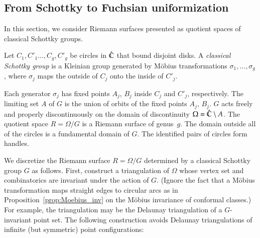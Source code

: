 \documentclass[Thesis]{subfiles}
\begin{document}
\subsection{From Schottky to Fuchsian uniformization}
\label{sec:schottky}

In this section, we consider Riemann surfaces presented as quotient
spaces of classical Schottky groups.

\begin{definition} Let $C_1,C'_1\ldots,C_g,C'_g$ be circles in
  $\hat{\mathbb C}$ that bound disjoint disks. A \emph{classical Schottky
    group} is a Kleinian group generated by M{\"o}bius transformations
  $\sigma_1,\ldots,\sigma_g$,
  where $\sigma_j$ maps the outside of $C_j$ onto the inside of $C'_j$.
\end{definition}

Each generator $\sigma_{j}$ has fixed points $A_{j}$, $B_{j}$ inside
$C_{j}$ and $C'_{j}$, respectively. The limiting set $A$ of $G$ is the
union of orbits of the fixed points $A_{j}$, $B_{j}$. $G$ acts freely
and properly discontinuously on the domain of discontinuity
$\Omega=\hat{\mathbb C}\setminus A$. The quotient space $R=\Omega/G$ is a
Riemann surface of genus~$g$. The domain outside all of the circles is
a fundamental domain of $G$. The identified pairs of circles form
handles.

We discretize the Riemann surface $R=\Omega/G$ determined by a
classical Schottky group $G$ as follows. First, construct a
triangulation of $\Omega$ whose vertex set and combinatorics are
invariant under the action of $G$. (Ignore the fact that a M{\"o}bius
transformation maps straight edges to circular arcs as in
Proposition~\ref{prop:Moebius_inv} on the M{\"o}bius invariance of
conformal classes.) For example, the triangulation may be the Delaunay
triangulation of a $G$-invariant point set. The following construction
avoids Delaunay triangulations of infinite (but symmetric) point
configurations:
\end{document}
